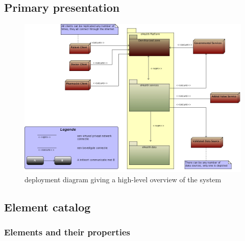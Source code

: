 \documentclass[a4paper,10pt]{article}
\begin{document}
\subsection{Primary presentation}
 \begin{center}
    \begin{figure}[!h]
      \includegraphics[width=\textwidth]{../images/deployment_DMZ.jpg}
	\caption{deployment diagram giving a high-level overview of the system}
    \end{figure}
 \end{center}

\subsection{Element catalog}

\subsubsection{Elements and their properties}
\end{document}
